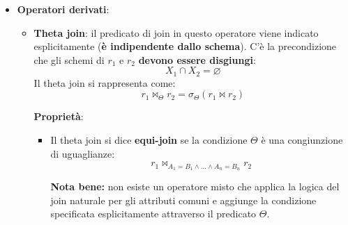 \documentclass[a4paper,twoside]{article}
\begin{document}
\begin{itemize}
\begin{itemize}
\begin{itemize}
\begin{example}
              \vspace{1em}
              \noindent
              Si richiede di produrre l'insieme dei corsi riportando: nome del corso e cognome del docente
              \[
                \begin{aligned}
                  &\Pi_{NomeCorso, Cognome}(\\
                  &\quad \rho_{Nome \to NomeCorso}(CORSO) \bowtie DOCENTE\\
                  &)
                \end{aligned}
              \]
            \end{example}

        \end{itemize}
    \end{itemize}

  \item \textbf{Operatori derivati}:
    \begin{itemize}
      \item \textbf{Theta join}: il predicato di join in questo operatore viene indicato
        esplicitamente (\textbf{è indipendente dallo schema}). C'è la precondizione 
        che gli schemi di \( r_1 \) e \( r_2 \) \textbf{devono essere disgiungi}:
        \[
          X_1 \cap X_2 = \varnothing
        \] 
        Il theta join si rappresenta come:
        \[
          r_1 \bowtie_{\Theta} r_2 = \sigma_{\Theta}(r_1 \bowtie r_2)
        \] 

        \vspace{1em}
        \noindent
        \textbf{Proprietà}:
        \begin{itemize}
          \item Il theta join si dice \textbf{equi-join} se la condizione \( \Theta  \) è
            una congiunzione di uguaglianze:
            \[
              r_1 \bowtie_{A_1 = B_1 \land \ldots \land A_n = B_n} r_2
            \] 

            \textbf{Nota bene:} non esiste un operatore misto che applica la logica del
            join naturale per gli attributi comuni e aggiunge la condizione specificata
            esplicitamente attraverso il predicato \( \Theta \).


\end{itemize}
\end{itemize}
\end{itemize}
\end{document}
